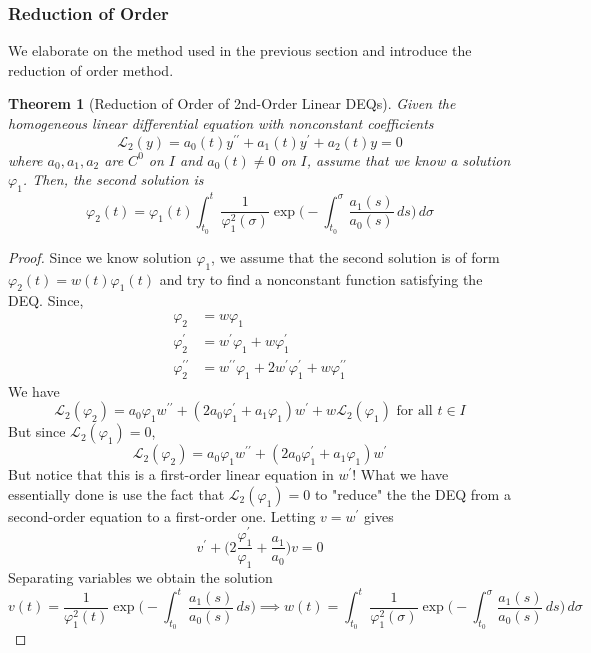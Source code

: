 \documentclass{article}
\newtheorem{theorem}{Theorem}[section]
\theoremstyle{remark}
\theoremstyle{definition}
\begin{document}
\subsubsection{Reduction of Order}
We elaborate on the method used in the previous section and introduce the reduction of order method. 

\begin{theorem}[Reduction of Order of 2nd-Order Linear DEQs]
Given the homogeneous linear differential equation with nonconstant coefficients 
\[\mathcal{L}_2 (y) = a_0 (t) y^{\prime\prime} + a_1 (t) y^\prime + a_2 (t) y = 0\]
where $a_0, a_1, a_2$ are $C^0$ on $I$ and $a_0 (t) \neq 0$ on $I$, assume that we know a solution $\varphi_1$. Then, the second solution is
\[\varphi_2 (t) = \varphi_1 (t) \int_{t_0}^t \frac{1}{\varphi_1^2 (\sigma)} \exp \bigg(- \int_{t_0}^\sigma \frac{a_1 (s)}{a_0 (s)}\,ds \bigg) \, d\sigma\]
\end{theorem}
\begin{proof}
Since we know solution $\varphi_1$, we assume that the second solution is of form $\varphi_2 (t) = w (t) \varphi_1 (t)$ and try to find a nonconstant function satisfying the DEQ. Since,
\begin{align*}
    \varphi_2 & = w \varphi_1 \\
    \varphi_2^\prime & = w^\prime \varphi_1 + w \varphi_1^\prime \\
    \varphi_2^{\prime\prime} & = w^{\prime\prime} \varphi_1 + 2 w^\prime \varphi_1^\prime + w \varphi_1^{\prime\prime}
\end{align*}
We have
\[\mathcal{L}_2 (\varphi_2) = a_0 \varphi_1 w^{\prime\prime} + (2 a_0 \varphi_1^\prime + a_1 \varphi_1) w^\prime + w \mathcal{L}_2 (\varphi_1) \text{ for all } t \in I\]
But since $\mathcal{L}_2 (\varphi_1) = 0$, 
\[\mathcal{L}_2 (\varphi_2) = a_0 \varphi_1 w^{\prime\prime} + (2 a_0 \varphi_1^\prime + a_1 \varphi_1) w^\prime\]
But notice that this is a first-order linear equation in $w^\prime$! What we have essentially done is use the fact that $\mathcal{L}_2 (\varphi_1) = 0$ to "reduce" the the DEQ from a second-order equation to a first-order one. Letting $v = w^\prime$ gives 
\[v^\prime + \bigg( 2 \frac{\varphi_1^\prime}{\varphi_1} + \frac{a_1}{a_0} \bigg) v = 0\]
Separating variables we obtain the solution
\[v(t) = \frac{1}{\varphi_1^2 (t)} \exp \bigg(- \int_{t_0}^t \frac{a_1(s)}{a_0 (s)} \,ds \bigg) \implies w(t) = \int_{t_0}^t \frac{1}{\varphi_1^2 (\sigma)} \exp \bigg(- \int_{t_0}^\sigma \frac{a_1(s)}{a_0 (s)} \,ds \bigg) \,d\sigma \]
\end{proof}
\end{document}
